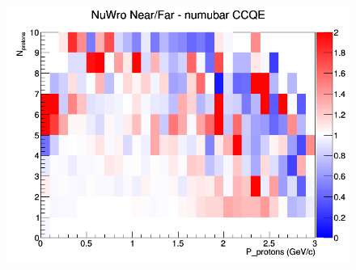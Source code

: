 \begin{figure}[h]
\endminipage
{}
\includegraphics[width=\linewidth]{N_P/nominal/protons/ratios/CCQE_NuWro_numubar_NF_N_P.png}
\endminipage
\newline
\end{figure}
\clearpage
